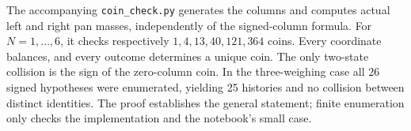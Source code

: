 \begin{example}\oursComputed
The accompanying \texttt{coin\_check.py} generates the columns and computes
actual left and right pan masses, independently of the signed-column
formula.  For \(N=1,\ldots,6\), it checks respectively
\(1,4,13,40,121,364\) coins.  Every coordinate balances, and every outcome
determines a unique coin.  The only two-state collision is the sign of the
zero-column coin.  In the three-weighing case all 26 signed hypotheses were
enumerated, yielding 25 histories and no collision between distinct
identities.  The proof establishes the general statement; finite enumeration
only checks the implementation and the notebook's small case.
\end{example}
